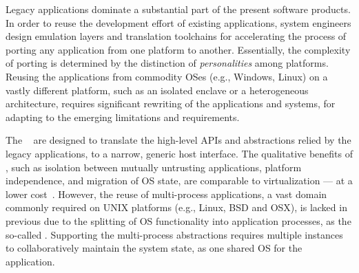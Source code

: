 Legacy applications dominate a substantial part of the present software products.
In order to reuse the development effort
of existing applications,
system engineers design emulation layers and translation toolchains
for accelerating the process of
porting any application from one platform to another.
Essentially, the complexity of porting is determined
by the distinction of \emph{personalities} among platforms.
Reusing the applications from commodity OSes (e.g., Windows, Linux)
on a vastly different platform,
such as an isolated enclave
or a heterogeneous architecture,
requires significant rewriting of the applications and systems,
for adapting to the emerging limitations and requirements.

The \term{\liboses{}}~\citep{porter11drawbridge, baumann13bascule, unikernels}
are designed to translate the high-level APIs
and abstractions
relied by the legacy applications,
to a narrow, generic host interface.
The qualitative benefits of \liboses{},
such as isolation between mutually untrusting applications,
platform independence,
and migration of OS state,
are comparable to virtualization
--- at a lower cost~\citep{porter11drawbridge}.
However, the reuse of multi-process applications, a vast domain
commonly required on UNIX platforms (e.g., Linux, BSD and OSX),
is lacked in previous \liboses{} due to
the splitting of OS functionality into application processes,
as the so-called \term{\picoprocs{}}.
Supporting the multi-process abstractions
requires multiple \libos{} instances to collaboratively maintain the system state,
as one shared OS for the application.






